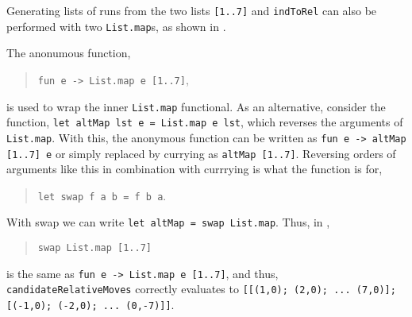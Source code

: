 Generating lists of runs from the two lists \lstinline{[1..7]} and \lstinline{indToRel} can also be performed with two \lstinline{List.map}s, as shown in .

\begin{comment}
As an example, consider the list of string-concatenations of every combination of \lstinline{["a","b"]} and \lstinline{["1"; "2"; "3"]}, i.e., \lstinline{["a1"; "a2"; "a3"; "b1"; "b2"; "b3"]}. For the first element in the letter-list, this can be hard-coded as
\begin{quote}
\lstinline{List.map (fun d -> "a"+d) ["1"; "2"; "3"]},
\end{quote}
which produces \lstinline{["a1"; "a2"; "a3"]}. Using an outer \lstinline{List.map} iterating over all letters looks like:
\begin{quote}
\lstinline{List.map (fun l -> List.map (fun d -> l+d) ["1";"2";"3"]) ["a"; "b"]},
\end{quote}
which produces \lstinline{[a1"; a2"; "a3"; "b1"; "b2"; "b3"]}.

The code for \lstinline{candidateRelativeMoves}, shown in \Cref{pieces}, is similar in spirit to the letter and digit example above, but is further complicated by the fact that \lstinline{indToRel} is a list of functions.
\end{comment}
%
%
The anonumous function,
\begin{quote}
\lstinline{fun e -> List.map e [1..7]},
\end{quote}
is used to wrap the inner \lstinline{List.map} functional. As an alternative, consider the function, \lstinline{let altMap lst e = List.map e lst}, which reverses the arguments of \lstinline{List.map}. With this, the anonymous function can be written as \lstinline{fun e -> altMap [1..7] e} or simply replaced by currying as \lstinline{altMap [1..7]}. Reversing orders of arguments like this in combination with currrying is what the  function is for,
\begin{quote}
\lstinline{let swap f a b = f b a}.
\end{quote}
With swap we can write \lstinline{let altMap = swap List.map}. Thus, in ,
\begin{quote}
\lstinline{swap List.map [1..7]}
\end{quote}
is the same as \lstinline{fun e -> List.map e [1..7]}, and thus, \lstinline{candidateRelativeMoves} correctly evaluates to \lstinline{[[(1,0); (2,0); ... (7,0)]; [(-1,0); (-2,0); ... (0,-7)]]}.

